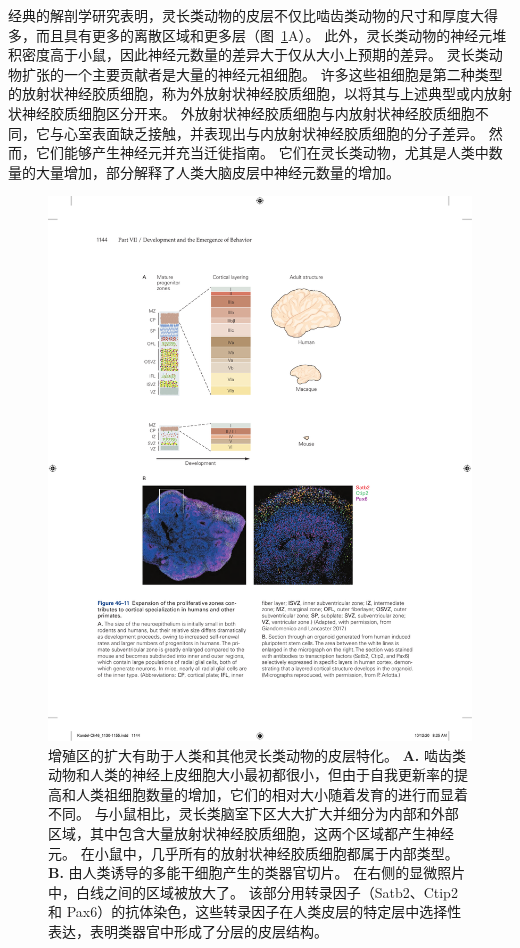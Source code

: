 经典的解剖学研究表明，灵长类动物的皮层不仅比啮齿类动物的尺寸和厚度大得多，而且具有更多的离散区域和更多层（图~\ref{fig:46_11}A）。
此外，灵长类动物的神经元堆积密度高于小鼠，因此神经元数量的差异大于仅从大小上预期的差异。
灵长类动物扩张的一个主要贡献者是大量的神经元祖细胞。
许多这些祖细胞是第二种类型的放射状神经胶质细胞，称为外放射状神经胶质细胞，以将其与上述典型或内放射状神经胶质细胞区分开来。
外放射状神经胶质细胞与内放射状神经胶质细胞不同，它与心室表面缺乏接触，并表现出与内放射状神经胶质细胞的分子差异。
然而，它们能够产生神经元并充当迁徙指南。
它们在灵长类动物，尤其是人类中数量的大量增加，部分解释了人类大脑皮层中神经元数量的增加。


\begin{figure}[htbp]
	\centering
	\includegraphics[width=1.0\linewidth]{chap46/fig_46_11}
	\caption{增殖区的扩大有助于人类和其他灵长类动物的皮层特化。
		\textbf{A.} 啮齿类动物和人类的神经上皮细胞大小最初都很小，但由于自我更新率的提高和人类祖细胞数量的增加，它们的相对大小随着发育的进行而显着不同。
		与小鼠相比，灵长类脑室下区大大扩大并细分为内部和外部区域，其中包含大量放射状神经胶质细胞，这两个区域都产生神经元。
		在小鼠中，几乎所有的放射状神经胶质细胞都属于内部类型\cite{giandomenico2017probing}。
		\textbf{B.} 由人类诱导的多能干细胞产生的类器官切片。
		在右侧的显微照片中，白线之间的区域被放大了。
		该部分用转录因子（Satb2、Ctip2 和 Pax6）的抗体染色，这些转录因子在人类皮层的特定层中选择性表达，表明类器官中形成了分层的皮层结构。}
	\label{fig:46_11}
\end{figure}


